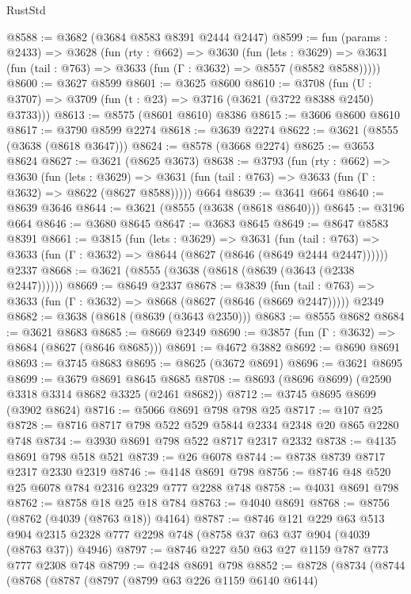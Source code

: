 \begin{lexlean}{RustStd}
\begin{coremodule}
@8588 := @3682 (@3684 @8583 @8391 @2444 @2447)
@8599 := fun (params : @2433) =>
  @3628
    (fun (rty : @662) =>
    @3630
      (fun (lets : @3629) =>
      @3631 (fun (tail : @763) => @3633 (fun (Γ : @3632) => @8557 (@8582 @8588)))))
@8600 := @3627 @8599
@8601 := @3625 @8600
@8610 := @3708 (fun (U : @3707) => @3709 (fun (t : @23) => @3716 (@3621 (@3722 @8388 @2450) @3733)))
@8613 := @8575 (@8601 @8610) @8386
@8615 := @3606 @8600 @8610
@8617 := @3790 @8599 @2274
@8618 := @3639 @2274
@8622 := @3621 (@8555 (@3638 (@8618 @3647)))
@8624 := @8578 (@3668 @2274)
@8625 := @3653 @8624
@8627 := @3621 (@8625 @3673)
@8638 := @3793
    (fun (rty : @662) =>
    @3630
      (fun (lets : @3629) =>
      @3631 (fun (tail : @763) => @3633 (fun (Γ : @3632) => @8622 (@8627 @8588)))))
    @664
@8639 := @3641 @664
@8640 := @8639 @3646
@8644 := @3621 (@8555 (@3638 (@8618 @8640)))
@8645 := @3196 @664
@8646 := @3680 @8645
@8647 := @3683 @8645
@8649 := @8647 @8583 @8391
@8661 := @3815
    (fun (lets : @3629) =>
    @3631
      (fun (tail : @763) => @3633 (fun (Γ : @3632) => @8644 (@8627 (@8646 (@8649 @2444 @2447))))))
    @2337
@8668 := @3621 (@8555 (@3638 (@8618 (@8639 (@3643 (@2338 @2447))))))
@8669 := @8649 @2337
@8678 := @3839
    (fun (tail : @763) => @3633 (fun (Γ : @3632) => @8668 (@8627 (@8646 (@8669 @2447)))))
    @2349
@8682 := @3638 (@8618 (@8639 (@3643 @2350)))
@8683 := @8555 @8682
@8684 := @3621 @8683
@8685 := @8669 @2349
@8690 := @3857 (fun (Γ : @3632) => @8684 (@8627 (@8646 @8685)))
@8691 := @4672 @3882
@8692 := @8690 @8691
@8693 := @3745 @8683
@8695 := @8625 (@3672 @8691)
@8696 := @3621 @8695
@8699 := @3679 @8691 @8645 @8685
@8708 := @8693 (@8696 @8699) (@2590 @3318 @3314 @8682 @3325 (@2461 @8682))
@8712 := @3745 @8695 @8699 (@3902 @8624)
@8716 := @5066 @8691 @798 @798 @25
@8717 := @107 @25
@8728 := @8716 @8717 @798 @522 @529 @5844 @2334 @2348 @20 @865 @2280 @748
@8734 := @3930 @8691 @798 @522 @8717 @2317 @2332
@8738 := @4135 @8691 @798 @518 @521
@8739 := @26 @6078
@8744 := @8738 @8739 @8717 @2317 @2330 @2319
@8746 := @4148 @8691 @798
@8756 := @8746 @48 @520 @25 @6078 @784 @2316 @2329 @777 @2288 @748
@8758 := @4031 @8691 @798
@8762 := @8758 @18 @25 @18 @784
@8763 := @4040 @8691
@8768 := @8756 (@8762 (@4039 (@8763 @18)) @4164)
@8787 := @8746
    @121
    @229
    @63
    @513
    @904
    @2315
    @2328
    @777
    @2298
    @748
    (@8758 @37 @63 @37 @904 (@4039 (@8763 @37)) @4946)
@8797 := @8746 @227 @50 @63 @27 @1159 @787 @773 @777 @2308 @748
@8799 := @4248 @8691 @798
@8852 := @8728
    (@8734
      (@8744
        (@8768
          (@8787
            (@8797
              (@8799 @63 @226 @1159 @6140 @6144)

\end{coremodule}
\end{lexlean}

